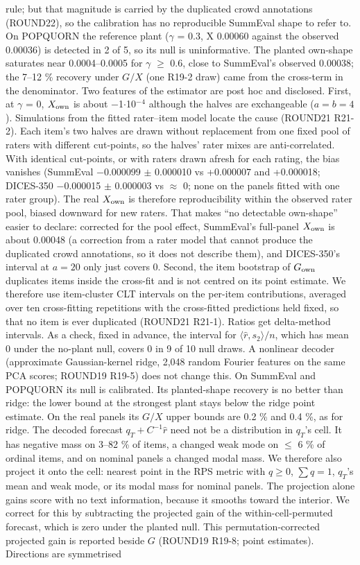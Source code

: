 \documentclass[10pt,twocolumn]{article}
\begin{document}
rule; but that magnitude is carried by the duplicated crowd annotations (ROUND22), so the calibration has no reproducible SummEval shape to refer to. On POPQUORN the reference plant ($\gamma$ = 0.3, X 0.00060 against the observed 0.00036) is detected in 2 of 5, so its null is uninformative. The planted own-shape saturates near 0.0004--0.0005 for $\gamma$ $\geq$ 0.6, close to SummEval's observed 0.00038; the 7--12 \% recovery under \(G/X\) (one R19-2 draw) came from the cross-term in the denominator. Two features of the estimator are post hoc and disclosed. First, at $\gamma$ = 0, \(X_{\rm own}\) is about $-$1$\cdot$10$^{-}$$^{4}$ although the halves are exchangeable (\(a=b=4\)). Simulations from the fitted rater--item model locate the cause (ROUND21 R21-2). Each item's two halves are drawn without replacement from one fixed pool of raters with different cut-points, so the halves' rater mixes are anti-correlated. With identical cut-points, or with raters drawn afresh for each rating, the bias vanishes (SummEval $-$0.000099 $\pm$ 0.000010 vs +0.000007 and +0.000018; DICES-350 $-$0.000015 $\pm$ 0.000003 vs $\approx$ 0; none on the panels fitted with one rater group). The real \(X_{\rm own}\) is therefore reproducibility within the observed rater pool, biased downward for new raters. That makes ``no detectable own-shape'' easier to declare: corrected for the pool effect, SummEval's full-panel \(X_{\rm own}\) is about 0.00048 (a correction from a rater model that cannot produce the duplicated crowd annotations, so it does not describe them), and DICES-350's interval at \(a=20\) only just covers 0. Second, the item bootstrap of \(G_{\rm own}\) duplicates items inside the cross-fit and is not centred on its point estimate. We therefore use item-cluster CLT intervals on the per-item contributions, averaged over ten cross-fitting repetitions with the cross-fitted predictions held fixed, so that no item is ever duplicated (ROUND21 R21-1). Ratios get delta-method intervals. As a check, fixed in advance, the interval for \(\langle\hat r,s_2\rangle/n\), which has mean 0 under the no-plant null, covers 0 in 9 of 10 null draws. A nonlinear decoder (approximate Gaussian-kernel ridge, 2,048 random Fourier features on the same PCA scores; ROUND19 R19-5) does not change this. On SummEval and POPQUORN its null is calibrated. Its planted-shape recovery is no better than ridge: the lower bound at the strongest plant stays below the ridge point estimate. On the real panels its \(G/X\) upper bounds are 0.2 \% and 0.4 \%, as for ridge. The decoded forecast \(q_T + C^{-1}\hat r\) need not be a distribution in \(q_T\)'s cell. It has negative mass on 3--82 \% of items, a changed weak mode on $\leq$ 6 \% of ordinal items, and on nominal panels a changed modal mass. We therefore also project it onto the cell: nearest point in the RPS metric with \(q\ge0\), \(\sum q=1\), \(q_T\)'s mean and weak mode, or its modal mass for nominal panels. The projection alone gains score with no text information, because it smooths toward the interior. We correct for this by subtracting the projected gain of the within-cell-permuted forecast, which is zero under the planted null. This permutation-corrected projected gain is reported beside \(G\) (ROUND19 R19-8; point estimates). Directions are symmetrised 
\end{document}
